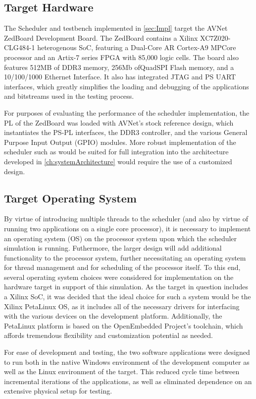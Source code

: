 \subsection{Target Hardware}\label{subsec:targetHW}
The Scheduler and testbench implemented in \ref{sec:Impl} target the AVNet ZedBoard Development Board. The ZedBoard contains a Xilinx XC7Z020-CLG484-1 heterogenous SoC, featuring a Dual-Core AR Cortex-A9 MPCore processor and an Artix-7 series FPGA with 85,000 logic cells. The board also features 512MB of DDR3 memory, 256Mb ofQuadSPI Flash memory, and a 10/100/1000 Ethernet Interface. It also has integrated JTAG and PS UART interfaces, which greatly simplifies the loading and debugging of the applications and bitstreams used in the testing process. 

For purposes of evaluating the performance of the scheduler implementation, the PL of the ZedBoard was loaded with AVNet's stock reference design, which instantiates the PS-PL interfaces, the DDR3 controller, and the various General Purpose Input Output (GPIO) modules. More robust implementation of the scheduler such as would be suited for full integration into the architecture developed in \ref{ch:systemArchitecture} would require the use of a customized design.

\subsection{Target Operating System}\label{subsec:os}
By virtue of introducing multiple threads to the scheduler (and also by virtue of running two applications on a single core processor), it is necessary to implement an operating system (OS) on the processor system upon which the scheduler simulation is running. Futhermore, the larger design will add additional functionality to the processor system, further necessitating an operating system for thread management and for scheduling of the processor itself. To this end, several operating system choices were considered for implementation on the hardware target in support of this simulation. As the target in question includes a Xilinx SoC, it was decided that the ideal choice for such a system would be the Xilinx PetaLinux OS, as it includes all of the necessary drivers for interfacing with the various devices on the development platform. Additionally, the PetaLinux platform is based on the OpenEmbedded Project's toolchain, which affords tremendous flexibility and customization potential as needed.

For ease of development and testing, the two software applications were designed to run both in the native Windows environment of the development computer as well as the Linux environment of the target. This reduced cycle time between incremental iterations of the applications, as well as eliminated dependence on an extensive physical setup for testing.


